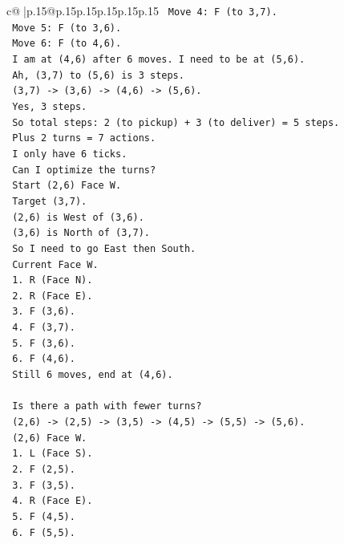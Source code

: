 \documentclass{article}
\begin{document}
{\begin{supertabular}{c@{$\;$}|p{.15\linewidth}@{}p{.15\linewidth}p{.15\linewidth}p{.15\linewidth}p{.15\linewidth}p{.15\linewidth}}
{{{\texttt{   Move 4: F (to 3,7).} \\
\texttt{   Move 5: F (to 3,6).} \\
\texttt{   Move 6: F (to 4,6).} \\
\texttt{   I am at (4,6) after 6 moves. I need to be at (5,6).} \\
\texttt{   Ah, (3,7) to (5,6) is 3 steps.} \\
\texttt{   (3,7) {-}> (3,6) {-}> (4,6) {-}> (5,6).} \\
\texttt{   Yes, 3 steps.} \\
\texttt{   So total steps: 2 (to pickup) + 3 (to deliver) = 5 steps.} \\
\texttt{   Plus 2 turns = 7 actions.} \\
\texttt{   I only have 6 ticks.} \\
\texttt{   Can I optimize the turns?} \\
\texttt{   Start (2,6) Face W.} \\
\texttt{   Target (3,7).} \\
\texttt{   (2,6) is West of (3,6).} \\
\texttt{   (3,6) is North of (3,7).} \\
\texttt{   So I need to go East then South.} \\
\texttt{   Current Face W.} \\
\texttt{   1. R (Face N).} \\
\texttt{   2. R (Face E).} \\
\texttt{   3. F (3,6).} \\
\texttt{   4. F (3,7).} \\
\texttt{   5. F (3,6).} \\
\texttt{   6. F (4,6).} \\
\texttt{   Still 6 moves, end at (4,6).} \\
\\ 
\texttt{   Is there a path with fewer turns?} \\
\texttt{   (2,6) {-}> (2,5) {-}> (3,5) {-}> (4,5) {-}> (5,5) {-}> (5,6).} \\
\texttt{   (2,6) Face W.} \\
\texttt{   1. L (Face S).} \\
\texttt{   2. F (2,5).} \\
\texttt{   3. F (3,5).} \\
\texttt{   4. R (Face E).} \\
\texttt{   5. F (4,5).} \\
\texttt{   6. F (5,5).} \\
}}}
\end{supertabular}}
\end{document}
